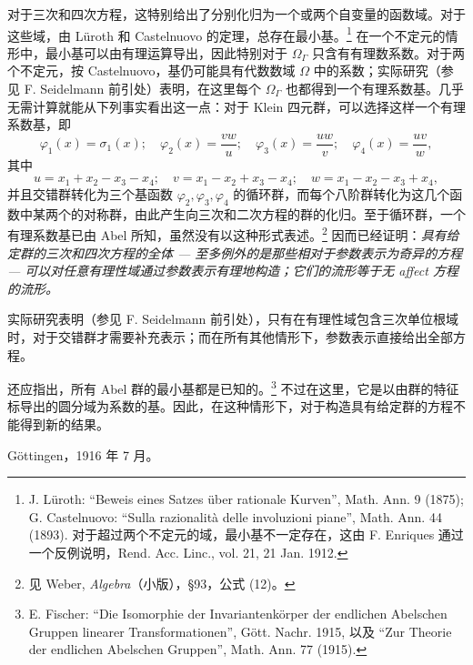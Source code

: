 对于三次和四次方程，这特别给出了分别化归为一个或两个自变量的函数域。对于这些域，由 Lüroth 和 Castelnuovo 的定理，总存在最小基。\footnote{J. Lüroth: “Beweis eines Satzes über rationale Kurven”, Math. Ann. 9 (1875); G. Castelnuovo: “Sulla razionalità delle involuzioni piane”, Math. Ann. 44 (1893). 对于超过两个不定元的域，最小基不一定存在，这由 F. Enriques 通过一个反例说明，Rend. Acc. Linc., vol. 21, 21 Jan. 1912.} 在一个不定元的情形中，最小基可以由有理运算导出，因此特别对于 $\Omega_\Gamma$ 只含有有理数系数。对于两个不定元，按 Castelnuovo，基仍可能具有代数数域 $\Omega$ 中的系数；实际研究（参见 F. Seidelmann 前引处）表明，在这里每个 $\Omega_\Gamma$ 也都得到一个有理系数基。几乎无需计算就能从下列事实看出这一点：对于 Klein 四元群，可以选择这样一个有理系数基，即
\[
\varphi_1(x)=\sigma_1(x);\quad
\varphi_2(x)=\frac{vw}{u};\quad
\varphi_3(x)=\frac{uw}{v};\quad
\varphi_4(x)=\frac{uv}{w},
\]
其中
\[
u=x_1+x_2-x_3-x_4;\quad v=x_1-x_2+x_3-x_4;\quad w=x_1-x_2-x_3+x_4,
\]
并且交错群转化为三个基函数 $\varphi_2,\varphi_3,\varphi_4$ 的循环群，而每个八阶群转化为这几个函数中某两个的对称群，由此产生向三次和二次方程的群的化归。至于循环群，一个有理系数基已由 Abel 所知，虽然没有以这种形式表述。\footnote{见 Weber, \emph{Algebra}（小版），\S 93，公式 (12)。} 因而已经证明：\emph{具有给定群的三次和四次方程的全体 --- 至多例外的是那些相对于参数表示为奇异的方程 --- 可以对任意有理性域通过参数表示有理地构造；它们的流形等于无 affect 方程的流形。}

实际研究表明（参见 F. Seidelmann 前引处），只有在有理性域包含三次单位根域时，对于交错群才需要补充表示；而在所有其他情形下，参数表示直接给出全部方程。

还应指出，所有 Abel 群的最小基都是已知的。\footnote{E. Fischer: “Die Isomorphie der Invariantenkörper der endlichen Abelschen Gruppen linearer Transformationen”, Gött. Nachr. 1915, 以及 “Zur Theorie der endlichen Abelschen Gruppen”, Math. Ann. 77 (1915).} 不过在这里，它是以由群的特征标导出的圆分域为系数的基。因此，在这种情形下，对于构造具有给定群的方程不能得到新的结果。

\medskip
\noindent Göttingen，1916 年 7 月。
